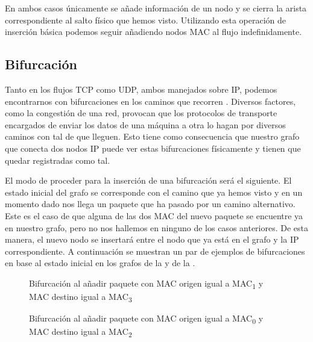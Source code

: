 \documentclass[twoside, 12pt]{epstfg}
\begin{document}
En ambos casos únicamente se añade información de un nodo y se cierra la arista correspondiente al salto físico que hemos visto. Utilizando esta operación de inserción básica podemos seguir añadiendo nodos MAC al flujo indefinidamente.

\subsection{Bifurcación}
Tanto en los flujos TCP como UDP, ambos manejados sobre IP, podemos encontrarnos con bifurcaciones en los caminos que recorren \cite{Priya}. Diversos factores, como la congestión de una red, provocan que los protocolos de transporte encargados de enviar los datos de una máquina a otra lo hagan por diversos caminos con tal de que lleguen. Esto tiene como consecuencia que nuestro grafo que conecta dos nodos IP puede ver estas bifurcaciones físicamente y tienen que quedar registradas como tal.

El modo de proceder para la inserción de una bifurcación será el siguiente. El estado inicial del grafo se corresponde con el camino que ya hemos visto y en un momento dado nos llega un paquete que ha pasado por un camino alternativo. Este es el caso de que alguna de las dos MAC del nuevo paquete se encuentre ya en nuestro grafo, pero no nos hallemos en ninguno de los casos anteriores. De esta manera, el nuevo nodo se insertará entre el nodo que ya está en el grafo y la IP correspondiente. A continuación se muestran un par de ejemplos de bifurcaciones en base al estado inicial en los grafos de la  y de la .

\begin{figure}[H]
\centering

\caption[Ejemplo de bifurcación 1]{Bifurcación al añadir paquete con MAC origen igual a MAC\textsubscript{1} y MAC destino igual a MAC\textsubscript{3}}
\label{fig:Analisis:Bifurcation1}
\end{figure}

\begin{figure}[H]
\centering

\caption[Ejemplo de bifurcación 2]{Bifurcación al añadir paquete con MAC origen igual a MAC\textsubscript{0} y MAC destino igual a MAC\textsubscript{2}}
\label{fig:Analisis:Bifurcation2}
\end{figure}

\end{document}

